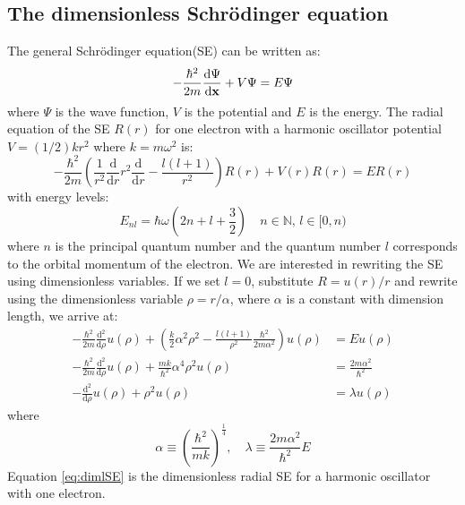 \documentclass{article} %
\begin{document}
\subsection{The dimensionless Schr\"{o}dinger equation}\label{ss:dimlSE}
The general Schr\"{o}dinger equation(SE) can be written as:
\begin{equation}\label{eq:Schr}
	-\frac{\hbar^2}{2m}\frac{{\rm d}\Psi}{{\rm d}\mathbf{x}}+V\Psi = E\Psi
\end{equation}
where $\Psi$ is the wave function, $V$ is the potential and $E$ is the energy.
The radial equation of the SE $R(r)$ for one electron with a harmonic oscillator potential $V=(1/2)kr^2$ where $k=m\omega^2$ is:
\begin{equation}\label{eq:radSE}
	-\frac{\hbar^2}{2m}\left(\frac{1}{r^2}\frac{\mathrm{d}}{\mathrm{d}r}r^2\frac{\mathrm{d}}{\mathrm{d}r}-\frac{l(l+1)}{r^2}\right)R(r)+V(r)R(r)=ER(r)
\end{equation}
with energy levels: \[E_{nl}=\hbar\omega\left(2n+l+\frac{3}{2}\right)\quad n\in\mathbb{N}, \,l\in[0,n)\] where $n$ is the principal quantum number and the quantum number $l$ corresponds to the orbital momentum of the electron. 
We are interested in rewriting the SE using dimensionless variables. If we set $l=0$, substitute $R=u(r)/r$ and rewrite using the dimensionless variable $\rho=r/\alpha$, where $\alpha$ is a constant with dimension length, we arrive at:
\begin{align}
	-\frac{\hbar^2}{2m}\frac{\mathrm{d^2}}{\mathrm{d}\rho}u(\rho)+\left(\frac{k}{2}\alpha^2\rho^2-\frac{l(l+1)}{\rho^2}\frac{\hbar^2}{2m\alpha^2}\right)u(\rho)
	&=Eu(\rho)\\
	-\frac{\hbar^2}{2m}\frac{\mathrm{d^2}}{\mathrm{d}\rho}u(\rho)+\frac{mk}{\hbar^2}\alpha^4\rho^2u(\rho)
	&=\frac{2m\alpha^2}{\hbar^2}\\
	\label{eq:dimlSE}
	-\frac{\mathrm{d^2}}{\mathrm{d}\rho}u(\rho)+\rho^2u(\rho)
	&=\lambda u(\rho)
\end{align}
where 
\[
	\alpha\equiv\left(\frac{\hbar^2}{mk}\right)^{\frac{1}{4}},\quad
	\lambda\equiv\frac{2m\alpha^2}{\hbar^2}E
\]
Equation \eqref{eq:dimlSE} is the dimensionless radial SE for a harmonic oscillator with one electron.
\end{document}
